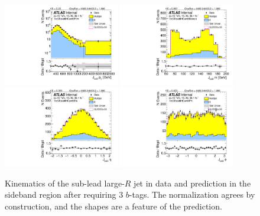 \begin{figure}[htbp!]
\begin{center}
\includegraphics[angle=270, width=0.45\textwidth]{./figures/boosted/Sideband/b77_ThreeTag_Sideband_sublHCand_Pt_m_1.pdf}
\includegraphics[angle=270, width=0.45\textwidth]{./figures/boosted/Sideband/b77_ThreeTag_Sideband_sublHCand_Mass_s.pdf}\\
\includegraphics[angle=270, width=0.45\textwidth]{./figures/boosted/Sideband/b77_ThreeTag_Sideband_sublHCand_Eta.pdf}
\includegraphics[angle=270, width=0.45\textwidth]{./figures/boosted/Sideband/b77_ThreeTag_Sideband_sublHCand_Phi.pdf}
  \caption{Kinematics of the sub-lead large-$R$ jet in data and prediction in the sideband region after requiring 3 $b$-tags. The normalization agrees by construction, and the shapes are a feature of the prediction.}
  \label{fig:boosted-3b-sideband-ak10-subl}
\end{center}
\end{figure}

